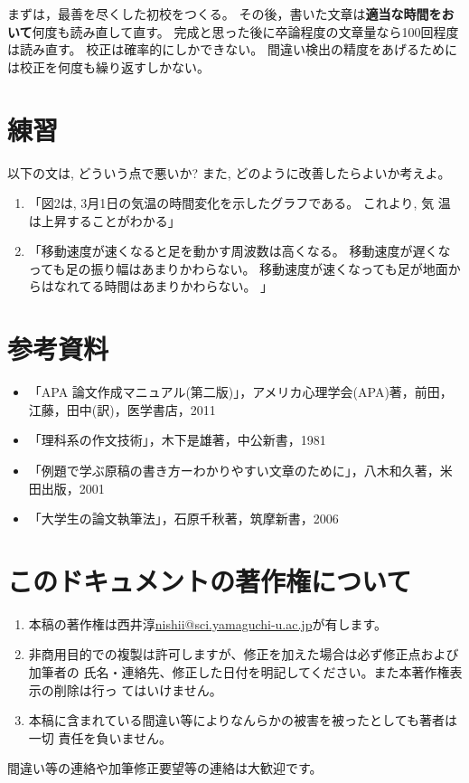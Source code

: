 \documentclass[12pt, ]{jsarticle}
\providecommand{\tightlist}{%
   \setlength{\itemsep}{0pt}\setlength{\parskip}{0pt}}
\begin{document}
まずは，最善を尽くした初校をつくる。
その後，書いた文章は\textbf{適当な時間をおいて}何度も読み直して直す。
完成と思った後に卒論程度の文章量なら100回程度は読み直す。
校正は確率的にしかできない。
間違い検出の精度をあげるためには校正を何度も繰り返すしかない。

\section{練習}\label{ux7df4ux7fd2}

以下の文は, どういう点で悪いか? また, どのように改善したらよいか考えよ。

\begin{enumerate}
\item
  「図2は, 3月1日の気温の時間変化を示したグラフである。 これより, 気
  温は上昇することがわかる」
\item
  「移動速度が速くなると足を動かす周波数は高くなる。
  移動速度が遅くなっても足の振り幅はあまりかわらない。
  移動速度が速くなっても足が地面からはなれてる時間はあまりかわらない。
  」
\end{enumerate}

\section*{参考資料}\label{ux305dux306eux4ed6ux53c2ux8003ux306bux306aux308bux8cc7ux6599}

\begin{itemize}
\tightlist
\item
  「APA
  論文作成マニュアル(第二版)」，アメリカ心理学会(APA)著，前田，江藤，田中(訳)，医学書店，2011
\item
  「理科系の作文技術」，木下是雄著，中公新書，1981
\item
  「例題で学ぶ原稿の書き方ーわかりやすい文章のために」，八木和久著，米田出版，2001
\item
  「大学生の論文執筆法」，石原千秋著，筑摩新書，2006
\end{itemize}

\section{このドキュメントの著作権について}\label{ux3053ux306eux30c9ux30adux30e5ux30e1ux30f3ux30c8ux306eux8457ux4f5cux6a29ux306bux3064ux3044ux3066}

\begin{enumerate}
\item
  本稿の著作権は西井淳\url{nishii@sci.yamaguchi-u.ac.jp}が有します。
\item
  非商用目的での複製は許可しますが、修正を加えた場合は必ず修正点および加筆者の
  氏名・連絡先、修正した日付を明記してください。また本著作権表示の削除は行っ
  てはいけません。
\item
  本稿に含まれている間違い等によりなんらかの被害を被ったとしても著者は一切
  責任を負いません。
\end{enumerate}

間違い等の連絡や加筆修正要望等の連絡は大歓迎です。
\end{document}
